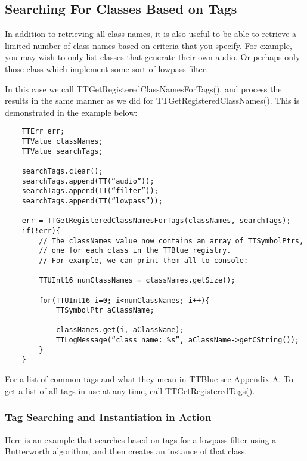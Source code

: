 \subsection{Searching For Classes Based on Tags}

In addition to retrieving all class names, it is also useful to be able to retrieve a limited number of class names based on criteria that you specify.  For example, you may wish to only list classes that generate their own audio.  Or perhaps only those class which implement some sort of lowpass filter.

In this case we call TTGetRegisteredClassNamesForTags(), and process the results in the same manner as we did for TTGetRegisteredClassNames().  This is demonstrated in the example below:

\begin{small}\begin{verbatim}
	TTErr err;
	TTValue classNames;
	TTValue searchTags;

	searchTags.clear();
	searchTags.append(TT(“audio”));
	searchTags.append(TT(“filter”));
	searchTags.append(TT(“lowpass”));

	err = TTGetRegisteredClassNamesForTags(classNames, searchTags);
	if(!err){
		// The classNames value now contains an array of TTSymbolPtrs, 
		// one for each class in the TTBlue registry.
		// For example, we can print them all to console:

		TTUInt16 numClassNames = classNames.getSize();

		for(TTUInt16 i=0; i<numClassNames; i++){
			TTSymbolPtr aClassName;

			classNames.get(i, aClassName);
			TTLogMessage(“class name: %s”, aClassName->getCString());
		}
	}
\end{verbatim}\end{small}

For a list of common tags and what they mean in TTBlue see Appendix A.  To get a list of all tags in use at any time, call TTGetRegisteredTags().


\subsubsection{Tag Searching and Instantiation in Action}

Here is an example that searches based on tags for a lowpass filter using a Butterworth algorithm, and then creates an instance of that class.


